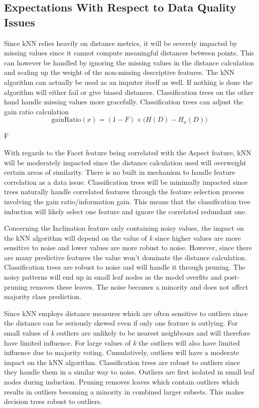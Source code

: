 \documentclass[conference]{IEEEtran}
\begin{document}
\subsection{Expectations With Respect to Data Quality Issues}
Since kNN relies heavily on distance metrics, it will be severely impacted by missing values since it cannot compute meaningful distances between points. This can however be handled by ignoring the missing values in the distance calculation and scaling up the weight of the non-missing descriptive features. The kNN algorithm can actually be used as an imputer itself as well. If nothing is done the algorithm will either fail or give biased distances. Classification trees on the other hand handle missing values more gracefully. Classification trees can adjust the gain ratio calculation 
\[
\text{gainRatio}(x) = (1 - F) \times \big( H(D) - H_x(D) \big)
\]

 F 



With regards to the Facet feature being correlated with the Aspect feature, kNN will be moderately impacted since the distance calculation used will overweight certain areas of similarity. There is no built in mechanism to handle feature correlation as a data issue. Classification trees will be minimally impacted since trees naturally handle correlated features through the feature selection process involving the gain ratio/information gain. This means that the classification tree induction will likely select one feature and ignore the correlated redundant one.

Concerning the Inclination feature only containing noisy values, the impact on the kNN algorithm will depend on the value of \textit{k} since higher values are more sensitive to noise and lower values are more robust to noise. However, since there are many predictive features the value won't dominate the distance calculation. Classification trees are robust to noise and will handle it through pruning. The noisy patterns will end up in small leaf nodes as the model overfits and post-pruning removes these leaves. The noise becomes a minority and does not affect majority class prediction.

Since kNN employs distance measures which are often sensitive to outliers since the distance can be seriously skewed even if only one feature is outlying. For small values of \textit{k} outliers are unlikely to be nearest neighbours and will therefore have limited influence. For large values of \textit{k} the outliers will also have limited influence due to majority voting. Cumulatively, outliers will have a moderate impact on the kNN algorithm. Classification trees are robust to outliers since they handle them in a similar way to noise. Outliers are first isolated in small leaf nodes during induction. Pruning removes leaves which contain outliers which results in outliers becoming a minority in combined larger subsets. This makes decision trees robust to outliers.
\end{document}
